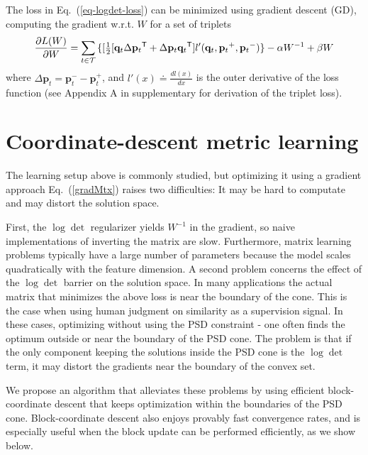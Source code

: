 \documentclass{article} %
\newcommand\mat[1]{{#1}}
\renewcommand\vec[1]{\mathbf{#1}}
\newcommand{\T}{{}^\mathsf{T}}
\newcommand{\W}{\mat{W}}
\newcommand{\eqdef}{\doteq}
\newcommand{\q}{{\vec{q}}}
\newcommand{\p}{{\vec{p}}}
\newcommand{\trip}{{t}}
\newcommand{\qt}{{\q_{\trip}}}
\newcommand{\pt}{{\p_{\trip}}}
\newcommand{\triplet}{(\qt, \pt^{+}, \pt^{-})}
\renewcommand{\eqref}[1]{Eq.~(\ref{#1})}
\begin{document}
The loss in \eqref{eq-logdet-loss} can be minimized using gradient descent (GD), computing the gradient w.r.t. $\W$ for a set of triplets
\begin{equation}
  \frac{\partial {L (\W)}}{\partial \W} = \sum\limits_{t\in \cal{T}}{\{
  [\tfrac{1}{2}[\q_{t}\Delta\p_{t}\T + \Delta\p_{t}\q_{t}\T]  }
  {l'}\triplet\} - \alpha \W^{-1} + \beta \W
  \label{gradMtx}
\end{equation}
where $\Delta\p_t = \p_t^- - \p_t^+$, and $l'(x) \eqdef \frac{d{l(x)}}{dx}$ is the outer derivative of the loss function (see Appendix A in supplementary for derivation of the triplet loss). 


\section{Coordinate-descent metric learning}

The learning setup above is commonly studied, but 
optimizing it using a gradient approach \eqref{gradMtx} raises two difficulties: It may be hard to computate and may distort the solution space.

First, the $\log \det$ regularizer yields $\W^{-1}$ in the gradient, so naive implementations of inverting the matrix are slow. Furthermore, matrix learning problems typically have a large number of parameters because the model scales quadratically with the feature dimension. A second problem concerns the effect of the $\log \det$ barrier on the solution space. In many applications the actual matrix that minimizes the above loss is near the boundary of the cone. This is the case when using human judgment on similarity as a supervision signal. In these cases, optimizing without using the PSD constraint - one often finds the optimum outside or near the boundary of the PSD cone. The problem is that if the only component keeping the solutions inside the PSD cone is the $\log \det$ term, it may distort the gradients near the boundary of the convex set. 

We propose an algorithm that alleviates these problems by using efficient block-coordinate descent that keeps optimization within the boundaries of the PSD cone.
Block-coordinate descent also enjoys provably fast convergence rates, and is especially useful when the block update can be performed efficiently, as we show below.
\end{document}
